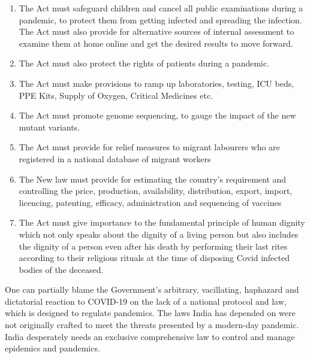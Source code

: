 \begin{multicols}{2}
\begin{enumerate}[label=$\bullet$]
\item The Act must safeguard children and cancel all public examinations during a
pandemic, to protect them from getting infected and spreading the infection. The Act
must also provide for alternative sources of internal assessment to examine them at
home online and get the desired results to move forward.

\item The Act must also protect the rights of patients during a pandemic.

\item The Act must make provisions to ramp up laboratories, testing, ICU beds, PPE Kits,
Supply of Oxygen, Critical Medicines etc.

\item The Act must promote genome sequencing, to gauge the impact of the new mutant
variants.

\item The Act must provide for relief measures to migrant labourers who are registered in a
national database of migrant workers

\item The New law must provide for estimating the country’s requirement and controlling
the price, production, availability, distribution, export, import, licencing, patenting,
efficacy, administration and sequencing of vaccines

\item The Act must give importance to the fundamental principle of human dignity which
not only speaks about the dignity of a living person but also includes the dignity of a
person even after his death by performing their last rites according to their religious
rituals at the time of disposing Covid infected bodies of the deceased.
\end{enumerate}

\vspace{-.5cm}

\noi
One can partially blame the Government’s arbitrary, vacillating, haphazard and dictatorial
reaction to COVID-19 on the lack of a national protocol and law, which is designed to
regulate pandemics. The laws India has depended on were not originally crafted to meet the
threats presented by a modern-day pandemic. India desperately needs an exclusive
comprehensive law to control and manage epidemics and pandemics.

\end{multicols}
